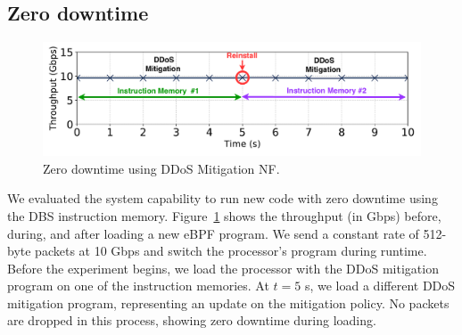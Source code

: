 


\subsection{Zero downtime}
\label{sec:downtime}

\begin{figure}[th]
\centering
\includegraphics[width=1.\linewidth]{figures/zero_downtime.pdf}\caption{Zero downtime using DDoS Mitigation NF.}
\label{fig:zerodowntime}
\end{figure}



We evaluated the system capability to run new code with zero downtime using the DBS instruction memory. Figure~\ref{fig:zerodowntime} shows the throughput (in Gbps) before, during, and after loading a new eBPF program. We send a constant rate of 512-byte packets at 10 Gbps and switch the processor's program during runtime. Before the experiment begins, we load the processor with the DDoS mitigation program on one of the instruction memories. At $t=5$ s, we load a different DDoS mitigation program, representing an update on the mitigation policy.
No packets are dropped in this process, showing zero downtime during loading.


